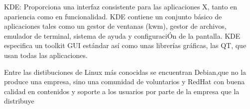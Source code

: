 \documentclass[etterpaper, 12pt, oneside]{article}%
\begin{document}
		KDE: Proporciona una interfaz consistente para las aplicaciones X, tanto en apariencia como en funcionalidad. KDE contiene un conjunto básico de aplicaciones tales como un gestor de ventanas (kwm), gestor de archivos, emulador de terminal, sistema de ayuda y configuraciÓn de la pantalla. KDE especifica un toolkit GUI estándar así como unas librerías gráficas, las QT, que usan todas las aplicaciones. 
		
Entre las distibuciones de Linux más conocidas se encuentran Debian,que no la produce una empresa, sino una comunidad de voluntarios y RedHat con buena calidad en contenidos y soporte a los usuarios por parte de la empresa que la distribuye
	
\end{document}
